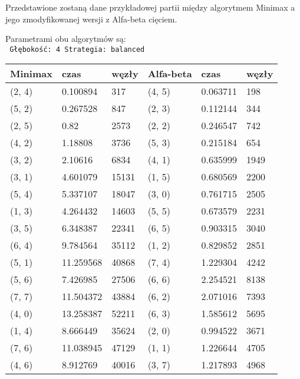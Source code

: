 \documentclass[12pt, a4paper]{article}
\begin{document}
Przedstawione zostaną dane przykładowej partii między algorytmem Minimax
a jego zmodyfikowanej wersji z Alfa-beta cięciem.

Parametrami obu algorytmów są: \\
\texttt{
    Głębokość: 4
    Strategia: balanced
}
\begin{center}
    \begin{tabular}{ | m{4em} | m{4.5em} | m{3em} | m{4em} | m{4.5em} | m{3em} |}
        \hline
        Minimax & czas & węzły & Alfa-beta & czas & węzły \\
        \hline
        (2, 4) & 0.100894 & 317 & (4, 5) & 0.063711 & 198 \\
        \hline
        (5, 2) & 0.267528 & 847 & (2, 3) & 0.112144 & 344 \\
        \hline
        (2, 5) & 0.82 & 2573 & (2, 2) & 0.246547 & 742 \\
        \hline
        (4, 2) & 1.18808 & 3736 & (5, 3) & 0.215184 & 654 \\
        \hline
        (3, 2) & 2.10616 & 6834 & (4, 1) & 0.635999 & 1949 \\
        \hline
        (3, 1) & 4.601079 & 15131 & (1, 5) & 0.680569 & 2200 \\
        \hline
        (5, 4) & 5.337107 & 18047 & (3, 0) & 0.761715 & 2505 \\
        \hline
        (1, 3) & 4.264432 & 14603 & (5, 5) & 0.673579 & 2231 \\
        \hline
        (3, 5) & 6.348387 & 22341 & (6, 5) & 0.903315 & 3040 \\
        \hline
        (6, 4) & 9.784564 & 35112 & (1, 2) & 0.829852 & 2851 \\
        \hline
        (5, 1) & 11.259568 & 40868 & (7, 4) & 1.229304 & 4242 \\
        \hline
        (5, 6) & 7.426985 & 27506 & (6, 6) & 2.254521 & 8138 \\
        \hline
        (7, 7) & 11.504372 & 43884 & (6, 2) & 2.071016 & 7393 \\
        \hline
        (4, 0) & 13.258387 & 52211 & (6, 3) & 1.585612 & 5695 \\
        \hline
        (1, 4) & 8.666449 & 35624 & (2, 0) & 0.994522 & 3671 \\
        \hline
        (7, 6) & 11.038945 & 47129 & (1, 1) & 1.226644 & 4705 \\
        \hline
        (4, 6) & 8.912769 & 40016 & (3, 7) & 1.217893 & 4968 \\
        \hline

\end{tabular}
\end{center}
\end{document}
